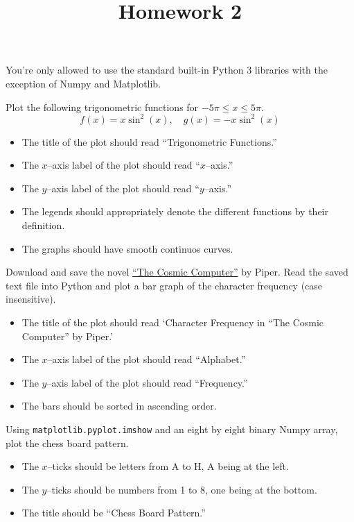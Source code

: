 \documentclass{homework}
\title{Homework 2}
\begin{document}
 \maketitle

You're only allowed to use the standard built-in Python 3
libraries with the exception of Numpy and Matplotlib.

\question Plot the following trigonometric functions for $-5\pi \leq x \leq 5\pi$.
\[
  f(x) = x\sin^2(x), \quad  g(x) = -x\sin^2(x)
\]
\begin{itemize}
  \item The title of the plot should read ``Trigonometric Functions.''
  \item The $x$--axis label of the plot should read ``$x$--axis.''
  \item The $y$--axis label of the plot should read ``$y$--axis.''
  \item The legends should appropriately denote the different functions by their definition.
  \item The graphs should have smooth continuos curves.
\end{itemize}

\question Download and save the novel
\href{https://www.gutenberg.org/files/20727/20727.txt}{``The Cosmic
  Computer''} by Piper. Read the saved text file into Python and plot
a bar graph of the character frequency (case insensitive).

\begin{itemize}
  \item The title of the plot should read `Character Frequency in ``The Cosmic Computer'' by Piper.'
  \item The $x$--axis label of the plot should read ``Alphabet.''
  \item The $y$--axis label of the plot should read ``Frequency.''
  \item The bars should be sorted in ascending order.
\end{itemize}

\question Using \texttt{matplotlib.pyplot.imshow} and an eight by eight binary Numpy array, plot the chess board pattern.

\begin{itemize}
  \item The $x$--ticks should be letters from A to H, A being at the left.
  \item The $y$--ticks should be numbers from 1 to 8, one being at the bottom.
  \item The title should be ``Chess Board Pattern.''
\end{itemize}
\end{document}
